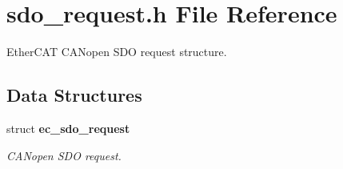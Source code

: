 \section{sdo\-\_\-request.\-h File Reference}
\label{sdo__request_8h}


Ether\-C\-A\-T C\-A\-Nopen S\-D\-O request structure.  


\subsection*{Data Structures}
\begin{DoxyCompactItemize}
\item 
struct {\bf ec\-\_\-sdo\-\_\-request}
\begin{DoxyCompactList}\small\item\em C\-A\-Nopen S\-D\-O request. \end{DoxyCompactList}\end{DoxyCompactItemize}
